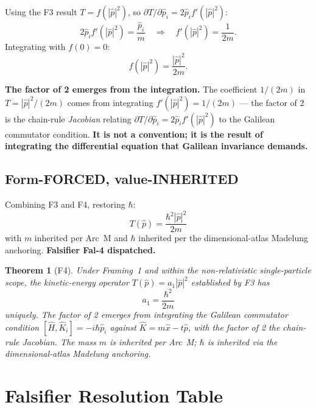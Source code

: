 \documentclass[11pt,a4paper]{article}
\newtheorem{theorem}{Theorem}[section]
\begin{document}
Using the F3 result $T = f(|\hat{p}|^2)$, so $\partial T / \partial \hat{p}_i = 2 \hat{p}_i f'(|\hat{p}|^2)$:
\[
2 \hat{p}_i f'(|\hat{p}|^2) = \frac{\hat{p}_i}{m} \quad \Longrightarrow \quad f'(|\hat{p}|^2) = \frac{1}{2m}.
\]
Integrating with $f(0) = 0$:
\begin{equation}
f(|\hat{p}|^2) = \frac{|\hat{p}|^2}{2m}. \label{eq:fresult}
\end{equation}

\textbf{The factor of 2 emerges from the integration.} The coefficient $1/(2m)$ in $T = |\hat{p}|^2/(2m)$ comes from integrating $f'(|\hat{p}|^2) = 1/(2m)$ --- the factor of 2 is the chain-rule \emph{Jacobian} relating $\partial T/\partial \hat{p}_i = 2 \hat{p}_i f'(|\hat{p}|^2)$ to the Galilean commutator condition. \textbf{It is not a convention; it is the result of integrating the differential equation that Galilean invariance demands.}

\subsection{Form-FORCED, value-INHERITED}

Combining F3 and F4, restoring $\hbar$:
\begin{equation}
T(\hat{p}) = \frac{\hbar^2 |\hat{p}|^2}{2m} \label{eq:Tfinal}
\end{equation}
with $m$ inherited per Arc~M and $\hbar$ inherited per the dimensional-atlas Madelung anchoring. \textbf{Falsifier Fal-4 dispatched.}

\begin{theorem}[F4]
Under Framing~1 and within the non-relativistic single-particle scope, the kinetic-energy operator $T(\hat{p}) = a_1 |\hat{p}|^2$ established by F3 has
\[
a_1 = \frac{\hbar^2}{2m}
\]
uniquely. The factor of 2 emerges from integrating the Galilean commutator condition $[\hat{H}, \hat{K}_i] = -i\hbar \hat{p}_i$ against $\hat{K} = m\hat{x} - t\hat{p}$, with the factor of 2 the chain-rule Jacobian. The mass $m$ is inherited per Arc~M; $\hbar$ is inherited via the dimensional-atlas Madelung anchoring.
\end{theorem}

\section{Falsifier Resolution Table}\label{sec:falsifier-table}
\end{document}
